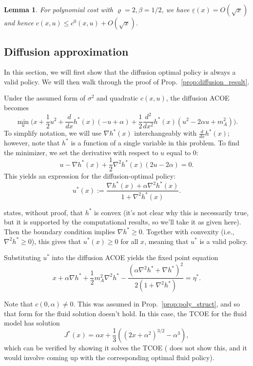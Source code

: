 \documentclass[11pt]{article}
\newtheorem{lemma}{Lemma}
\begin{document}
\begin{lemma}
For polynomial cost with $\varrho = 2, \beta = 1/2$, we have $\underline \varepsilon(x) = O(\sqrt{x})$ and hence $c(x,u) \leq c^0(x,u) + O(\sqrt{x})$.
\end{lemma}


\subsection{Diffusion approximation}\label{appendix:diffusion}

In this section, we will first show that the diffusion optimal policy is always a valid policy. We will then walk through the proof of Prop.~\ref{prop:diffusion_result}.

Under the assumed form of $\sigma^2$ and quadratic $c(x,u)$, the diffusion ACOE becomes
$$\min_u \Big( x + \frac{1}{2}u^2 + \frac{d}{dx} h^*(x) (-u + \alpha) + \frac{1}{2} \frac{d^2}{dx^2} h^*(x) (u^2 -2\alpha u + m_A^2)\Big).$$
To simplify notation, we will use $\nabla h^*(x)$ interchangeably with $\frac{d}{dx} h^*(x)$; however, note that $h^*$ is a function of a single variable in this problem. To find the minimizer, we set the derivative with respect to $u$ equal to 0:
$$u - \nabla h^*(x) + \frac{1}{2} \nabla^2 h^*(x) (2u - 2\alpha) = 0.$$
This yields an expression for the diffusion-optimal policy:
$$u^*(x) := \frac{\nabla h^*(x) + \alpha \nabla^2 h^*(x)}{1+\nabla^2 h^*(x)}.$$

\cite{paper} states, without proof, that $h^*$ is convex (it's not clear why this is necessarily true, but it is supported by the computational results, so we'll take it as given here). Then the boundary condition implies $\nabla h^* \geq 0$. Together with convexity (i.e., $\nabla^2 h^* \geq 0$), this gives that $u^*(x) \geq 0$ for all $x$, meaning that $u^*$ is a valid policy.

Substituting $u^*$ into the diffusion ACOE yields the fixed point equation
$$x + \alpha \nabla h^* + \frac{1}{2} m_A^2 \nabla^2 h^* - \frac{(\alpha \nabla^2 h^* + \nabla h^*)^2}{2(1+\nabla^2 h^*)} = \eta^*.$$

Note that $c(0,\alpha) \neq 0$. This was assumed in Prop.~\ref{prop:poly_struct}, and so that form for the fluid solution doesn't hold. In this case, the TCOE for the fluid model has solution
$$J^*(x) = \alpha x + \frac{1}{3} \left( (2x + \alpha^2)^{3/2} - \alpha^3 \right),$$
which can be verified by showing it solves the TCOE (\cite{paper} does not show this, and it would involve coming up with the corresponding optimal fluid policy).
\end{document}
